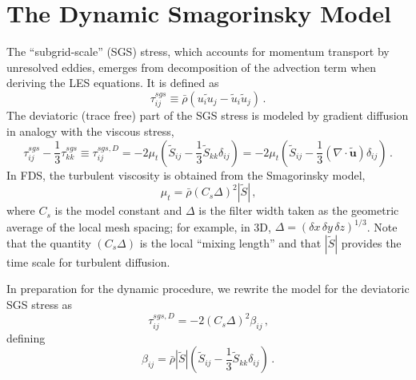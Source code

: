 \chapter{The Dynamic Smagorinsky Model}
\label{app_dynsmag}

The ``subgrid-scale'' (SGS) stress, which accounts for momentum transport by unresolved eddies, emerges from decomposition of the advection term when deriving the LES equations.  It is defined as
\begin{equation}
\label{eqn_tau_sgs}
\tau_{ij}^{sgs} \equiv \bar{\rho}(\widetilde{u_i u_j} - \tilde{u}_i \tilde{u}_j) \,\mbox{.}
\end{equation}
The deviatoric (trace free) part of the SGS stress is modeled by gradient diffusion in analogy with the viscous stress,
\begin{equation}
\label{eqn_tau_sgs_deviatoric}
\tau_{ij}^{sgs} - \frac{1}{3}\tau_{kk}^{sgs} \equiv \tau_{ij}^{sgs,D} = -2 \mu_t \left(\tilde{S}_{ij} - \frac{1}{3}\tilde{S}_{kk}\delta_{ij}\right) =  -2 \mu_t \left(\tilde{S}_{ij} - \frac{1}{3} (\nabla\!\cdot\tilde{\mathbf{u}}) \delta_{ij}\right) \,\mbox{.}
\end{equation}
In FDS, the turbulent viscosity is obtained from the Smagorinsky model,
\begin{equation}
\label{eqn_mu_turb}
\mu_t = \bar{\rho}(C_s \Delta)^2 |\tilde{S}| \,\mbox{,}
\end{equation}
where $C_s$ is the model constant and $\Delta$ is the filter width taken as the geometric average of the local mesh spacing; for example, in 3D, $\Delta = (\delta x \,\delta y \,\delta z)^{1/3}$.  Note that the quantity $(C_s \Delta)$ is the local ``mixing length'' and that $|\tilde{S}|$ provides the time scale for turbulent diffusion.

In preparation for the dynamic procedure, we rewrite the model for the deviatoric SGS stress as
\begin{equation}
\label{eqn_tau_sgs_deviatoric2}
\tau_{ij}^{sgs,D} = -2 (C_s \Delta)^2 \beta_{ij} \,\mbox{,}
\end{equation}
defining
\begin{equation}
\label{eqn_beta}
\beta_{ij} = \bar{\rho} |\tilde{S}| \left(\tilde{S}_{ij} - \frac{1}{3} \tilde{S}_{kk} \delta_{ij} \right)  \,\mbox{.}
\end{equation}


